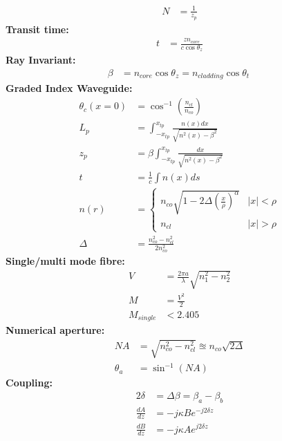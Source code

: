 \documentclass[landscape,a4paper,8pt]{article}
\begin{document}
\begin{multicols}{4}
	\begin{align}
		N &= \frac{1}{z_p}
	\end{align}
	\hspace{3mm}\textbf{Transit time:}
	\begin{align}
		t &= \frac{z n_{core}}{c \cos \theta_z}
	\end{align}
	\hspace{3mm}\textbf{Ray Invariant:}
	\begin{align}
		\beta &= n_{core} \cos \theta_z = n_{cladding} \cos \theta_t\
	\end{align}
	\hspace{3mm}\textbf{Graded Index Waveguide:}
	\begin{align}
		\theta_c (x=0) &= \cos^{-1} \left( \frac{n_{cl}}{n_{co}} \right)\\
		L_p &= \int_{-x_{tp}}^{x_{tp}} \frac{n(x) dx}{\sqrt{n^2 (x) - \beta^2}}\\
		z_p &= \beta \int_{-x_{tp}}^{x_{tp}} \frac{dx}{\sqrt{n^2(x) - \beta^2}}\\
		t &= \frac{1}{c} \int n(x) ds\\
		n(r) &= 
		\begin{cases}
			n_{co} \sqrt{1 - 2\Delta \left( \frac{x}{\rho} \right)^\alpha} & |x| < \rho\\
			n_{cl} & |x| > \rho
		\end{cases}\\
		\Delta &= \frac{n_{co}^2 - n_{cl}^2}{2n_{co}^2}
	\end{align}
	\textbf{Single/multi mode fibre:}
	\begin{align}
		V &= \frac{2\pi a}{\lambda} \sqrt{n_1^2 - n_2^2}\\
		M &= \frac{V^2}{2}\\
		M_{single} &< 2.405
	\end{align}
	\hspace{3mm}\textbf{Numerical aperture:}
	\begin{align}
	NA &= \sqrt{n_{co}^2 - n_{cl}^2} \approxeq n_{co} \sqrt{2\Delta}\\
	\theta_a &= \sin^{-1} (NA)
	\end{align}
	\textbf{Coupling:}
	\begin{align}
		2\delta &= \Delta \beta = \beta_a - \beta_b\\
		\frac{dA}{dz} &= -j\kappa B e^{-j2\delta z}\\
		\frac{dB}{dz} &= -j\kappa A e^{j2\delta z}

\end{align}
\end{multicols}
\end{document}
